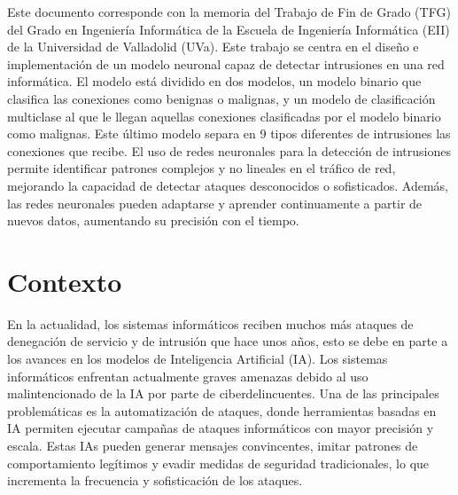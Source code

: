 Este documento corresponde con la memoria del Trabajo de Fin de Grado (TFG) del Grado en Ingeniería Informática de la Escuela de Ingeniería Informática (EII) de la Universidad de Valladolid (UVa). Este trabajo se centra en el diseño e implementación de un modelo neuronal capaz de detectar intrusiones en una red informática. El modelo está dividido en dos modelos, un modelo binario que clasifica las conexiones como benignas o malignas, y un modelo de clasificación multiclase al que le llegan aquellas conexiones clasificadas por el modelo binario como malignas. Este último modelo separa en 9 tipos diferentes de intrusiones las conexiones que recibe. El uso de redes neuronales para la detección de intrusiones permite identificar patrones complejos y no lineales en el tráfico de red, mejorando la capacidad de detectar ataques desconocidos o sofisticados. Además, las redes neuronales pueden adaptarse y aprender continuamente a partir de nuevos datos, aumentando su precisión con el tiempo.


\section{Contexto} \label{sec.exp-problema}
En la actualidad, los sistemas informáticos reciben muchos más ataques de denegación de servicio y de intrusión que hace unos años, esto se debe en parte a los avances en los modelos de Inteligencia Artificial (IA). Los sistemas informáticos enfrentan actualmente graves amenazas debido al uso malintencionado de la IA por parte de ciberdelincuentes. Una de las principales problemáticas es la automatización de ataques, donde herramientas basadas en IA permiten ejecutar campañas de ataques informáticos con mayor precisión y escala. Estas IAs pueden generar mensajes convincentes, imitar patrones de comportamiento legítimos y evadir medidas de seguridad tradicionales, lo que incrementa la frecuencia y sofisticación de los ataques. 

